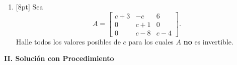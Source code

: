 \documentclass[11pt]{article}
\begin{document}
\begin{enumerate}
\begin{minipage}[t]{0.46\linewidth}
\vspace{6pt}
(c)\quad $\det(B^{-1}) = $ \dotfill
\end{minipage}%
\begin{minipage}[t]{0.5\linewidth}
(b)\quad $\det(2B^T) = $ \dotfill

\vspace{6pt}
(d)\quad $\mathrm{rango}(A) = $ \dotfill
\end{minipage}

\item{}[8pt] Sea
\[
A = \begin{bmatrix}c+3 & -c & 6\\ 0 & c+1 & 0\\ 0 & c-8 & c-4\end{bmatrix}.
\]
Halle todos los valores posibles de $c$ para los cuales $A$ \textbf{no} es invertible.

\vspace{4pt}
\end{enumerate}

\vspace{6pt}
\begin{center}\textbf{II. Solución con Procedimiento}\end{center}
\end{document}
